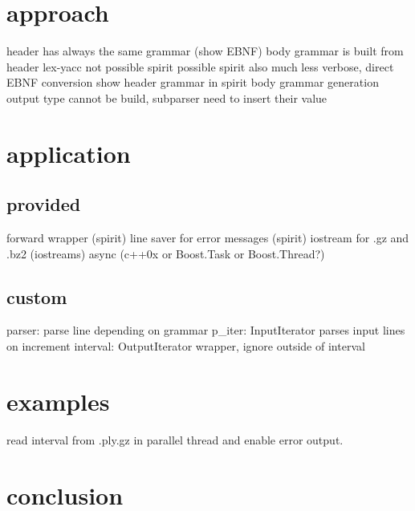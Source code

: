 \documentclass{article}
\begin{document}
\section{approach}
%
header has always the same grammar (show EBNF)
body grammar is built from header
lex-yacc not possible
spirit possible
spirit also much less verbose, direct EBNF conversion
show header grammar in spirit
body grammar generation
output type cannot be build, subparser need to insert their value

\section{application}
%
\subsection{provided}
forward wrapper (spirit)
line saver for error messages (spirit)
iostream for .gz and .bz2 (iostreams)
async (c++0x or Boost.Task or Boost.Thread?)

\subsection{custom}
parser: parse line depending on grammar
p\_iter: InputIterator parses input lines on increment
interval: OutputIterator wrapper, ignore outside of interval

\section{examples}
read interval from .ply.gz in parallel thread and enable error output.

\section{conclusion}
\end{document}
